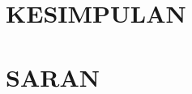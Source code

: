 \vspace{1.5pc}
\vspace{1.5pc}
\begin{spacing}{1.5}
\section[Kesimpulan]{KESIMPULAN}

\lipsum[2-4]

\section[Saran]{SARAN}

\lipsum[2-4]

\end{spacing}